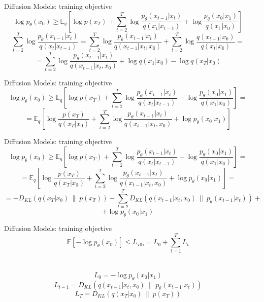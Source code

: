 \documentclass{beamer}
\begin{document}
\begin{frame}[t]{Diffusion Models: training objective \cite{sohldickstein2015deep}}
    $$ \log p_\theta(x_0) \geq \mathbb{E}_q \left[ \log p(x_T) + \sum_{t=2}^T \log \frac{p_\theta(x_{t-1}|x_t)}{q(x_t|x_{t-1})} + \log \frac{p_\theta(x_0|x_1)}{q(x_1|x_0)} \right] $$
    $$ \sum_{t=2}^T \log \frac{p_\theta(x_{t-1}|x_t)}{q(x_t|x_{t-1})} = \sum_{t=2}^T \log \frac{p_\theta(x_{t-1}|x_t)}{q(x_{t-1}|x_t, x_0)} + \sum_{t=2}^T \log \frac{q(x_{t-1}|x_0)}{q(x_t|x_0)} = $$
    $$ = \sum_{t=2}^T \log \frac{p_\theta(x_{t-1}|x_t)}{q(x_{t-1}|x_t, x_0)} + \log q(x_1|x_0) - \log q(x_T|x_0) $$
\end{frame}

\begin{frame}[t]{Diffusion Models: training objective \cite{sohldickstein2015deep}}
    $$ \log p_\theta(x_0) \geq \mathbb{E}_q \left[ \log p(x_T) + \sum_{t=2}^T \log \frac{p_\theta(x_{t-1}|x_t)}{q(x_t|x_{t-1})} + \log \frac{p_\theta(x_0|x_1)}{q(x_1|x_0)} \right] = $$
    $$ = \mathbb{E}_q \left[ \log \frac{p(x_T)}{q(x_T|x_0)} + \sum_{t=2}^T \log \frac{p_\theta(x_{t-1}|x_t)}{q(x_{t-1}|x_t, x_0)} + \log p_\theta(x_0|x_1) \right] $$
\end{frame}

\begin{frame}[t]{Diffusion Models: training objective \cite{sohldickstein2015deep}}
    $$ \log p_\theta(x_0) \geq \mathbb{E}_q \left[ \log p(x_T) + \sum_{t=2}^T \log \frac{p_\theta(x_{t-1}|x_t)}{q(x_t|x_{t-1})} + \log \frac{p_\theta(x_0|x_1)}{q(x_1|x_0)} \right] = $$
    $$ = \mathbb{E}_q \left[ \log \frac{p(x_T)}{q(x_T|x_0)} + \sum_{t=2}^T \log \frac{p_\theta(x_{t-1}|x_t)}{q(x_{t-1}|x_t, x_0)} + \log p_\theta(x_0|x_1) \right] = $$
    $$ = - D_{KL} (q(x_T|x_0)\ \|\ p(x_T)) - \sum_{t=2}^T D_{KL} (q(x_{t-1}|x_t, x_0)\ \|\ p_\theta(x_{t-1}|x_t)) + $$
    $$ + \log p_\theta(x_0|x_1) $$
\end{frame}

\begin{frame}{Diffusion Models: training objective \cite{sohldickstein2015deep}}
    $$ \mathbb{E}[-\log p_\theta(x_0)] \leq L_{\text{vlb}} = L_0 + \sum_{t=1}^T L_t $$ \\~\\
    $$ L_0 = -\log p_\theta(x_0|x_1) $$
    $$ L_{t-1} = D_{KL} (q(x_{t-1}|x_t, x_0)\ \|\ p_\theta(x_{t-1}|x_t)) $$
    $$ L_T = D_{KL} (q(x_T|x_0)\ \|\ p(x_T)) $$
\end{frame}
\end{document}
